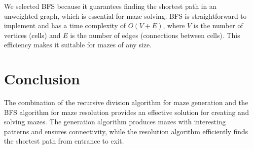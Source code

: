 \documentclass{article}
\begin{document}
We selected BFS because it guarantees finding the shortest path in an unweighted graph, which is essential for maze solving. BFS is straightforward to implement and has a time complexity of \(O(V + E)\), where \(V\) is the number of vertices (cells) and \(E\) is the number of edges (connections between cells). This efficiency makes it suitable for mazes of any size.

\section*{Conclusion}

The combination of the recursive division algorithm for maze generation and the BFS algorithm for maze resolution provides an effective solution for creating and solving mazes. The generation algorithm produces mazes with interesting patterns and ensures connectivity, while the resolution algorithm efficiently finds the shortest path from entrance to exit.
\end{document}
